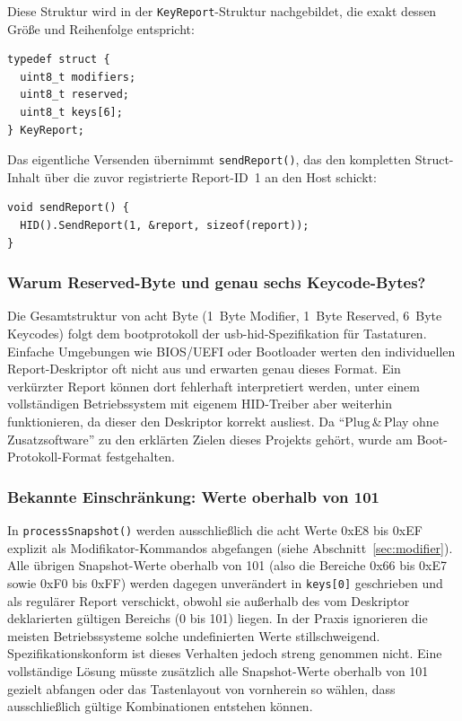 \documentclass{article}
\begin{document}
Diese Struktur wird in der \texttt{KeyReport}-Struktur nachgebildet, die exakt dessen Größe und Reihenfolge entspricht:

\begin{lstlisting}[style=arduino]
typedef struct {
  uint8_t modifiers;
  uint8_t reserved;
  uint8_t keys[6];
} KeyReport;
\end{lstlisting}

Das eigentliche Versenden übernimmt \texttt{sendReport()}, das den kompletten Struct-Inhalt über die zuvor registrierte Report-ID~1 an den Host schickt:

\begin{lstlisting}[style=arduino]
void sendReport() {
  HID().SendReport(1, &report, sizeof(report));
}
\end{lstlisting}

\subsubsection{Warum Reserved-Byte und genau sechs Keycode-Bytes?}

Die Gesamtstruktur von acht Byte (1~Byte Modifier, 1~Byte Reserved, 6~Byte Keycodes) folgt dem \gls{bootprotokoll} der \gls{usb-hid}-Spezifikation für Tastaturen. Einfache Umgebungen wie BIOS/UEFI oder Bootloader werten den individuellen Report-Deskriptor oft nicht aus und erwarten genau dieses Format. Ein verkürzter Report können dort fehlerhaft interpretiert werden, unter einem vollständigen Betriebssystem mit eigenem HID-Treiber aber weiterhin funktionieren, da dieser den Deskriptor korrekt ausliest.
Da \enquote{Plug\,\&\,Play ohne Zusatzsoftware} zu den erklärten Zielen dieses Projekts gehört, wurde am Boot-Protokoll-Format festgehalten.

\subsubsection{Bekannte Einschränkung: Werte oberhalb von 101}
In \texttt{processSnapshot()} werden ausschließlich die acht Werte 0xE8 bis 0xEF explizit als Modifikator-Kommandos abgefangen (siehe Abschnitt~\ref{sec:modifier}). Alle übrigen Snapshot-Werte oberhalb von 101 (also die Bereiche 0x66 bis 0xE7 sowie 0xF0 bis 0xFF) werden dagegen unverändert in \texttt{keys[0]} geschrieben und als regulärer Report verschickt, obwohl sie außerhalb des vom Deskriptor deklarierten gültigen Bereichs (0 bis 101) liegen. In der Praxis ignorieren die meisten Betriebssysteme solche undefinierten Werte stillschweigend. Spezifikationskonform ist dieses Verhalten jedoch streng genommen nicht. Eine vollständige Lösung müsste zusätzlich alle Snapshot-Werte oberhalb von 101 gezielt abfangen oder das Tastenlayout von vornherein so wählen, dass ausschließlich gültige Kombinationen entstehen können.
\end{document}

